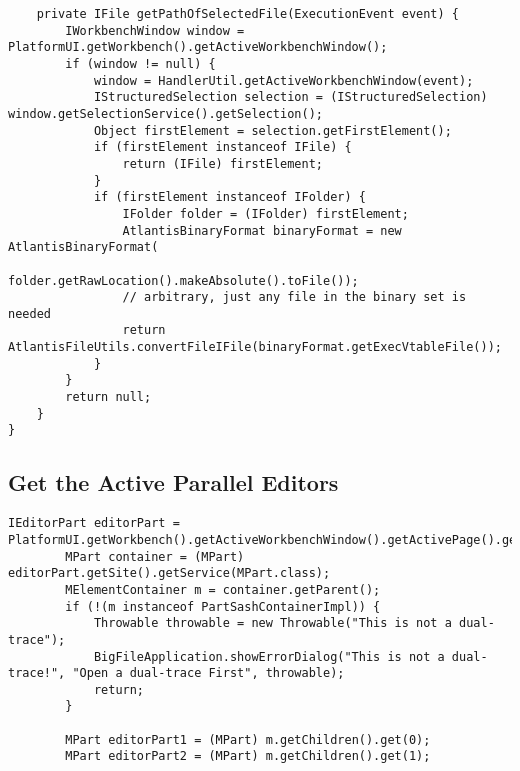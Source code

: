 \begin{lstlisting}
	private IFile getPathOfSelectedFile(ExecutionEvent event) {
		IWorkbenchWindow window = PlatformUI.getWorkbench().getActiveWorkbenchWindow();
		if (window != null) {
			window = HandlerUtil.getActiveWorkbenchWindow(event);
			IStructuredSelection selection = (IStructuredSelection) window.getSelectionService().getSelection();
			Object firstElement = selection.getFirstElement();
			if (firstElement instanceof IFile) {
				return (IFile) firstElement;
			}
			if (firstElement instanceof IFolder) {
				IFolder folder = (IFolder) firstElement;
				AtlantisBinaryFormat binaryFormat = new AtlantisBinaryFormat(
						folder.getRawLocation().makeAbsolute().toFile());
				// arbitrary, just any file in the binary set is needed
				return AtlantisFileUtils.convertFileIFile(binaryFormat.getExecVtableFile());
			}
		}
		return null;
	}
}
\end{lstlisting}

\subsection{Get the Active Parallel Editors}
\begin{lstlisting}
IEditorPart editorPart = PlatformUI.getWorkbench().getActiveWorkbenchWindow().getActivePage().getActiveEditor();
		MPart container = (MPart) editorPart.getSite().getService(MPart.class);
		MElementContainer m = container.getParent();
		if (!(m instanceof PartSashContainerImpl)) {
			Throwable throwable = new Throwable("This is not a dual-trace");
			BigFileApplication.showErrorDialog("This is not a dual-trace!", "Open a dual-trace First", throwable);
			return;
		}

		MPart editorPart1 = (MPart) m.getChildren().get(0);
		MPart editorPart2 = (MPart) m.getChildren().get(1);
\end{lstlisting}